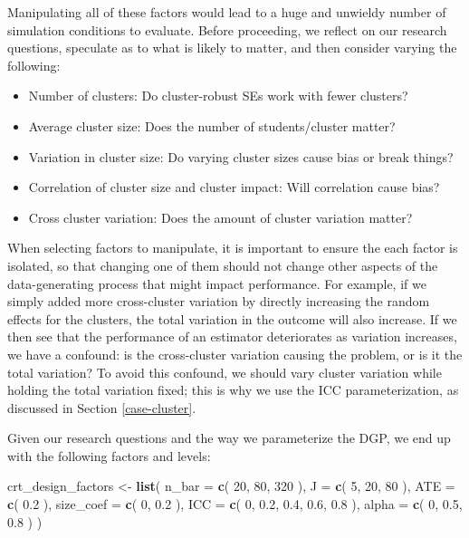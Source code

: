 \documentclass[
]{book}
\newenvironment{Shaded}{\begin{snugshade}}{\end{snugshade}}
\newcommand{\AttributeTok}[1]{\textcolor[rgb]{0.13,0.29,0.53}{#1}}
\newcommand{\DecValTok}[1]{\textcolor[rgb]{0.00,0.00,0.81}{#1}}
\newcommand{\FloatTok}[1]{\textcolor[rgb]{0.00,0.00,0.81}{#1}}
\newcommand{\FunctionTok}[1]{\textcolor[rgb]{0.13,0.29,0.53}{\textbf{#1}}}
\newcommand{\NormalTok}[1]{#1}
\newcommand{\OtherTok}[1]{\textcolor[rgb]{0.56,0.35,0.01}{#1}}
\providecommand{\tightlist}{%
  \setlength{\itemsep}{0pt}\setlength{\parskip}{0pt}}
\begin{document}
Manipulating all of these factors would lead to a huge and unwieldy number of simulation conditions to evaluate.
Before proceeding, we reflect on our research questions, speculate as to what is likely to matter, and then consider varying the following:

\begin{itemize}
\tightlist
\item
  Number of clusters: Do cluster-robust SEs work with fewer clusters?
\item
  Average cluster size: Does the number of students/cluster matter?
\item
  Variation in cluster size: Do varying cluster sizes cause bias or break things?
\item
  Correlation of cluster size and cluster impact: Will correlation cause bias?
\item
  Cross cluster variation: Does the amount of cluster variation matter?
\end{itemize}

When selecting factors to manipulate, it is important to ensure the each factor is isolated, so that changing one of them should not change other aspects of the data-generating process that might impact performance.
For example, if we simply added more cross-cluster variation by directly increasing the random effects for the clusters, the total variation in the outcome will also increase.
If we then see that the performance of an estimator deteriorates as variation increases, we have a confound: is the cross-cluster variation causing the problem, or is it the total variation?
To avoid this confound, we should vary cluster variation while holding the total variation fixed; this is why we use the ICC parameterization, as discussed in Section \ref{case-cluster}.

Given our research questions and the way we parameterize the DGP, we end up with the following factors and levels:

\begin{Shaded}
\begin{Highlighting}[]
\NormalTok{crt\_design\_factors }\OtherTok{\textless{}{-}} \FunctionTok{list}\NormalTok{(}
  \AttributeTok{n\_bar =} \FunctionTok{c}\NormalTok{( }\DecValTok{20}\NormalTok{, }\DecValTok{80}\NormalTok{, }\DecValTok{320}\NormalTok{ ),}
  \AttributeTok{J =} \FunctionTok{c}\NormalTok{( }\DecValTok{5}\NormalTok{, }\DecValTok{20}\NormalTok{, }\DecValTok{80}\NormalTok{ ),}
  \AttributeTok{ATE =} \FunctionTok{c}\NormalTok{( }\FloatTok{0.2}\NormalTok{ ),}
  \AttributeTok{size\_coef =} \FunctionTok{c}\NormalTok{( }\DecValTok{0}\NormalTok{, }\FloatTok{0.2}\NormalTok{ ),}
  \AttributeTok{ICC =} \FunctionTok{c}\NormalTok{( }\DecValTok{0}\NormalTok{, }\FloatTok{0.2}\NormalTok{, }\FloatTok{0.4}\NormalTok{, }\FloatTok{0.6}\NormalTok{, }\FloatTok{0.8}\NormalTok{ ),}
  \AttributeTok{alpha =} \FunctionTok{c}\NormalTok{( }\DecValTok{0}\NormalTok{, }\FloatTok{0.5}\NormalTok{, }\FloatTok{0.8}\NormalTok{ )}
\NormalTok{)}
\end{Highlighting}
\end{Shaded}
\end{document}
